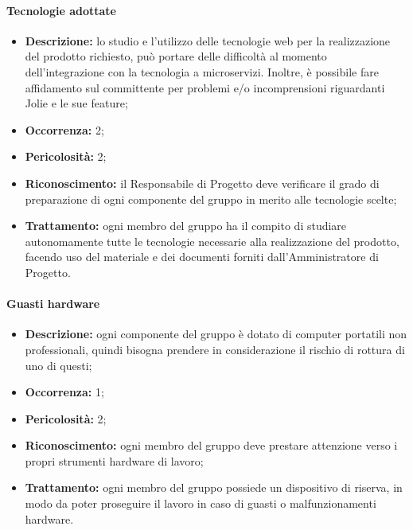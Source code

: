 \paragraph{Tecnologie adottate}
\begin{itemize}
	\item \textbf{Descrizione:} lo studio e l'utilizzo delle tecnologie web per la realizzazione del prodotto richiesto, può portare delle difficoltà al momento dell'integrazione con la tecnologia a microservizi. Inoltre, è possibile fare affidamento sul committente per problemi e/o incomprensioni riguardanti Jolie e le sue feature;
	\item \textbf{Occorrenza:} 2;
	\item \textbf{Pericolosità:} 2;
	\item \textbf{Riconoscimento:} il Responsabile di Progetto deve verificare il grado di preparazione di ogni componente del gruppo in merito alle tecnologie scelte;
	\item \textbf{Trattamento:} ogni membro del gruppo ha il compito di studiare autonomamente tutte le tecnologie necessarie alla realizzazione del prodotto, facendo uso del materiale e dei documenti forniti dall’Amministratore di Progetto.
\end{itemize}

\paragraph{Guasti hardware}
\begin{itemize}
	\item \textbf{Descrizione:} ogni componente del gruppo è dotato di computer portatili non professionali, quindi bisogna prendere in considerazione il rischio di rottura di uno di questi;
	\item \textbf{Occorrenza:} 1;
	\item \textbf{Pericolosità:} 2;
	\item \textbf{Riconoscimento:} ogni membro del gruppo deve prestare attenzione verso i propri strumenti hardware di lavoro;
	\item \textbf{Trattamento:} ogni membro del gruppo possiede un dispositivo di riserva, in modo da poter proseguire il lavoro in caso di guasti o malfunzionamenti hardware.
\end{itemize}

